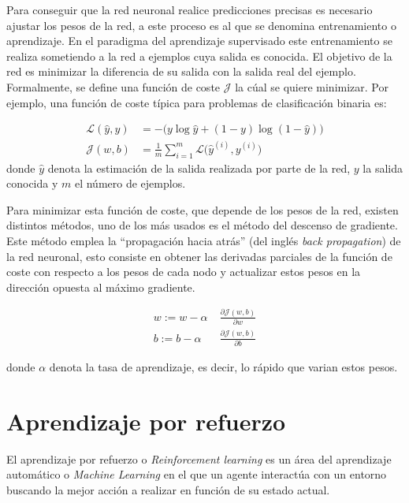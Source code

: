  Para conseguir que la red neuronal realice predicciones precisas es necesario ajustar los pesos de la red, a este proceso es al que se denomina entrenamiento o aprendizaje. En el paradigma del aprendizaje supervisado este entrenamiento se realiza sometiendo a la red a ejemplos cuya salida es conocida. El objetivo de la red es minimizar la diferencia de su salida con la salida real del ejemplo. Formalmente, se define una función de coste $\mathcal{J}$ la cúal se quiere minimizar. Por ejemplo, una función de coste típica para problemas de clasificación binaria es:
 
 \begin{align}
 \mathcal{L}(\hat{y},y)&=-\big(y\log\hat{y} + (1-y)\log(1-\hat{y})\big)\\ 
 \mathcal{J}(w,b)&=\frac{1}{m}\sum_{i=1}^{m}{\mathcal{L}\big(\hat{y}^{(i)},{y}^{(i)}\big)}
 \end{align}
 donde $\hat{y}$ denota la estimación de la salida realizada por parte de la red, $y$ la salida conocida y $m$ el número de ejemplos. 
 
 Para minimizar esta función de coste, que depende de los pesos de la red, existen distintos métodos, uno de los más usados es el método del descenso de gradiente. Este método emplea la ``propagación hacia atrás'' (del inglés \textit{back propagation}) de la red neuronal, esto consiste en obtener las derivadas parciales de la función de coste con respecto a los pesos de cada nodo y actualizar estos pesos en la dirección opuesta al máximo gradiente.
 
 \begin{align}
 	w:= w - \alpha\; &\frac{\partial\mathcal{J}(w,b)}{\partial w}\\
 	b:= b - \alpha\; &\frac{\partial\mathcal{J}(w,b)}{\partial b}
 \end{align}
 
 donde $\alpha$ denota la tasa de aprendizaje, es decir, lo rápido que varian estos pesos.

 



\section{Aprendizaje por refuerzo}

El aprendizaje por refuerzo o \textit{Reinforcement learning} \cite{sutton2018reinforcement} es un área del aprendizaje automático o \textit{Machine Learning} en el que un agente interactúa con un entorno buscando la mejor acción a realizar en función de su estado actual.

